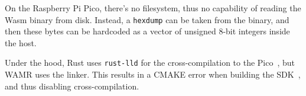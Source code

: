 

On the Raspberry Pi Pico, there's no filesystem, thus no capability of reading the \gls{Wasm} binary from disk. Instead, a \texttt{hexdump} can be taken from the binary, and then these bytes can be hardcoded as a vector of unsigned 8-bit integers inside the host. 

Under the hood, Rust uses \texttt{rust-lld} for the cross-compilation to the Pico~\cite{lld}, but WAMR uses the  linker. This results in a CMAKE error when building the SDK~\cite{gh:wrs:error}, and thus disabling cross-compilation.


